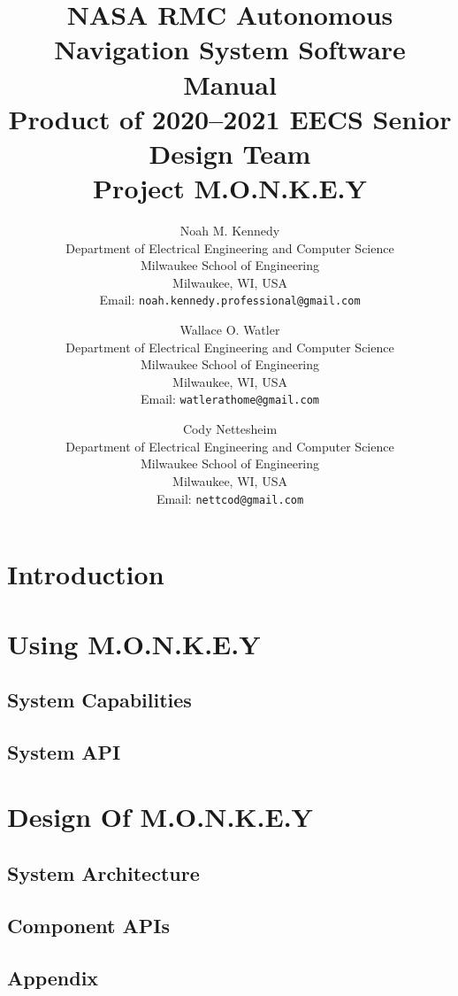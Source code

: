 \documentclass[8pt]{report}
\title{
    NASA RMC Autonomous Navigation System Software Manual \\
    Product of 2020--2021 EECS Senior Design Team \\
    Project M.O.N.K.E.Y
}
\author{
    Noah M. Kennedy \\[3pt]
    {\small Department of Electrical Engineering and Computer Science} \\
    {\small Milwaukee School of Engineering} \\
    {\small Milwaukee, WI, USA} \\
    {\small Email: {\texttt{noah.kennedy.professional@gmail.com} }} \\[12pt]
    \and
    Wallace O. Watler \\[3pt]
    {\small Department of Electrical Engineering and Computer Science} \\
    {\small Milwaukee School of Engineering} \\
    {\small Milwaukee, WI, USA} \\
    {\small Email: {\texttt{watlerathome@gmail.com} }} \\[12pt]
    \and
    Cody Nettesheim \\[3pt]
    {\small Department of Electrical Engineering and Computer Science} \\
    {\small Milwaukee School of Engineering} \\
    {\small Milwaukee, WI, USA} \\
    {\small Email: {\texttt{nettcod@gmail.com} }} \\[12pt]
}
\begin{document}
    \maketitle
    \newpage


    \tableofcontents
    \newpage


    \chapter{Introduction}\label{ch:introduction}
    
    \newpage


    \chapter{Using M.O.N.K.E.Y}\label{ch:using-monkey}
    \section{System Capabilities}\label{sec:system-capabilities}
    \newpage


    \section{System API}\label{sec:system-api}
    
    \newpage


    \chapter{Design Of M.O.N.K.E.Y}\label{ch:design-of-monkey}

    \section{System Architecture}\label{sec:system-architecture}
    
    \newpage


    \section{Component APIs}\label{sec:components}
    
    \newpage

    \section*{Appendix}\label{sec:appendix}
    
    \newpage

    \printbibliography
\end{document}
